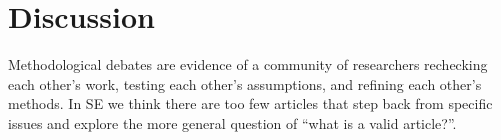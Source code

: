 \documentclass[10pt]{elsarticle}
\begin{document}




\section{Discussion} \label{tion:Disc}

Methodological debates are evidence of a community of researchers rechecking each other's work, testing each other's assumptions, and refining each other's methods. 
In SE we think there are too few articles that step back from specific issues and explore the more general question of ``what is a valid article?''. 
\end{document}
